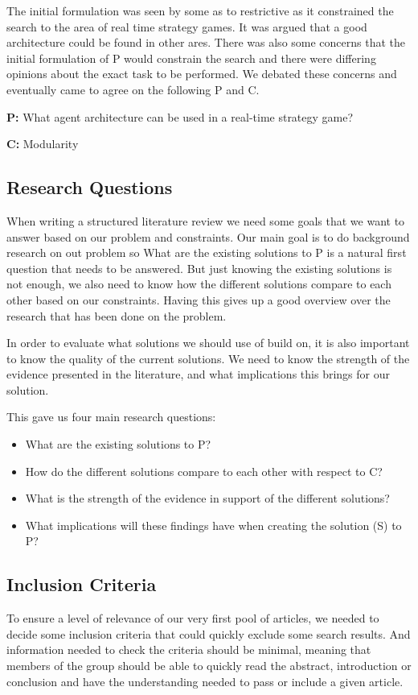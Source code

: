 The initial formulation was seen by some as to restrictive as it constrained the search to the area of real time strategy games. It was argued that a good architecture could be found in other ares. There was also some concerns that the initial formulation of P would constrain the search and there were differing opinions about the exact task to be performed. We debated these concerns and eventually came to agree on the following P and C.

\textbf{P:} What agent architecture can be used in a real-time strategy game?

\textbf{C:} Modularity

\subsection{Research Questions}
\label{sub:research_questions}
When writing a structured literature review we need some goals that we want to answer based on our problem and constraints. Our main goal is to do background research on out problem so What are the existing solutions to P is a natural first question that needs to be answered. But just knowing the existing solutions is not enough, we also need to know how the different solutions compare to each other based on our constraints. Having this gives up a good overview over the research that has been done on the problem. 

In order to evaluate what solutions we should use of build on, it is also important to know the quality of the current solutions. We need to know the strength of the evidence presented in the literature, and what implications this brings for our solution.

This gave us four main research questions:
\begin{itemize}
\item What are the existing solutions to P?
\item How do the different solutions compare to each other with respect to C?
\item What is the strength of the evidence in support of the different solutions?
\item What implications will these findings have when creating the solution (S) to P?
\end{itemize}

\subsection{Inclusion Criteria}
\label{sub:inclusion_criteria}
To ensure a level of relevance of our very first pool of articles, we needed to decide some inclusion criteria that could quickly exclude some search results. And information needed to check the criteria should be minimal, meaning that members of the group should be able to quickly read the abstract, introduction or conclusion and have the understanding needed to pass or include a given article.

